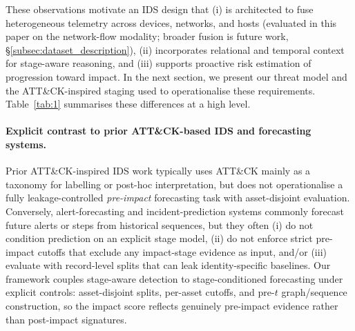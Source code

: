 \documentclass[pdflatex,sn-mathphys-num]{sn-jnl}
\theoremstyle{thmstyleone}%
\theoremstyle{thmstyletwo}%
\theoremstyle{thmstylethree}%
\begin{document}
These observations motivate an IDS design that (i) is architected to fuse heterogeneous telemetry across devices, networks, and hosts (evaluated in this paper on the network-flow modality; broader fusion is future work, \S\ref{subsec:dataset_description}), (ii) incorporates relational and temporal context for stage-aware reasoning, and (iii) supports proactive risk estimation of progression toward impact. In the next section, we present our threat model and the ATT\&CK-inspired staging used to operationalise these requirements. Table~\ref{tab:1} summarises these differences at a high level.

\paragraph{Explicit contrast to prior ATT\&CK-based IDS and forecasting systems.}
Prior ATT\&CK-inspired IDS work typically uses ATT\&CK mainly as a taxonomy for labelling or post-hoc interpretation, but does not operationalise a fully leakage-controlled \emph{pre-impact} forecasting task with asset-disjoint evaluation. Conversely, alert-forecasting and incident-prediction systems commonly forecast future alerts or steps from historical sequences, but they often (i) do not condition prediction on an explicit stage model, (ii) do not enforce strict pre-impact cutoffs that exclude any impact-stage evidence as input, and/or (iii) evaluate with record-level splits that can leak identity-specific baselines. Our framework couples stage-aware detection to stage-conditioned forecasting under explicit controls: asset-disjoint splits, per-asset cutoffs, and pre-$t$ graph/sequence construction, so the impact score reflects genuinely pre-impact evidence rather than post-impact signatures.
\end{document}
